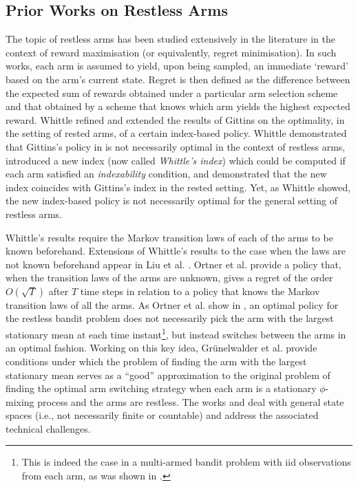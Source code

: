 \subsection{Prior Works on Restless Arms}
The topic of restless arms has been studied extensively in the literature in the context of reward maximisation (or equivalently, regret minimisation). In such works, each arm is assumed to yield, upon being sampled, an immediate `reward' based on the arm's current state. Regret is then defined as the difference between the expected sum of rewards obtained under a particular arm selection scheme and that obtained by a scheme that knows which arm yields the highest expected reward. Whittle \cite{whittle1988restless} 
refined and extended the results of Gittins \cite{gittins1979bandit} on the optimality, in the setting of rested arms, of a certain index-based policy. Whittle \cite{whittle1988restless} demonstrated that Gittins's policy in \cite{gittins1979bandit} is not necessarily optimal in the context of restless arms, introduced a new index (now called \emph{Whittle's index}) which could be computed if each arm satisfied an \emph{indexability} condition, and demonstrated that the new index coincides with Gittins's index in the rested setting. 
Yet, as Whittle showed, the new index-based policy is not necessarily optimal for the general setting of restless arms.

Whittle's results require the Markov transition laws of each of the arms to be known beforehand. Extensions of Whittle's results to the case when the laws are not known beforehand appear in Liu et al. \cite{liu2012learning}. Ortner et al. \cite{ortner2012regret} provide a policy that, when the transition laws of the arms are unknown, gives a regret of the order $O(\sqrt{T})$ after $T$ time steps in relation to a policy that knows the Markov transition laws of all the arms. As Ortner et al. show in \cite{ortner2012regret}, an optimal policy for the restless bandit problem does not necessarily pick the arm with the largest stationary mean at each time instant\footnote{This is indeed the case in a multi-armed bandit problem with iid observations from each arm, as was shown in \cite{auer2002finite}.}, but instead switches between the arms in an optimal fashion. Working on this key idea, Gr\"unelwalder et al.  \cite{grunewalder2019approximations} provide conditions under which the problem of finding the arm with the largest stationary mean serves as a ``good'' approximation to the original problem of finding the optimal arm switching strategy when each arm is a stationary $\phi$-mixing process and the arms are restless. The works \cite{ortner2012regret} and \cite{grunewalder2019approximations} deal with general state spaces (i.e., not necessarily finite or countable) and address the associated technical challenges.

